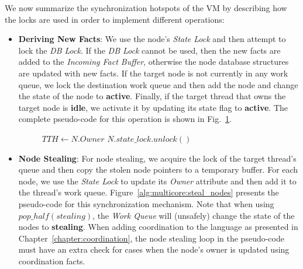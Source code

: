 
We now summarize the synchronization hotspots of the VM by describing how the locks
are used in order to implement different operations:

\begin{itemize}

   \item \textbf{Deriving New Facts}: We use the node's \emph{State Lock} and
      then attempt to lock the \emph{DB Lock}. If the \emph{DB Lock} cannot be
      used, then the new facts are added to the \emph{Incoming Fact Buffer},
      otherwise the node database structures are updated with new facts. If the
      target node is not currently in any work queue, we lock the destination
      work queue and then add the node and change the state of the node to
      \textbf{active}. Finally, if the target thread that owns the target node
      is \textbf{idle}, we activate it by updating its state flag to
      \textbf{active}. The complete pseudo-code for this operation is shown in
      Fig.~\ref{alg:multicore:new_fact}.

\begin{figure}
\begin{algorithm}[H]
   $TTH \longleftarrow N.Owner$\;
   $N.state\_lock.unlock()$\;
\end{algorithm}
 \label{alg:multicore:new_fact}
\end{figure}


   \item \textbf{Node Stealing}: For node stealing, we acquire the lock of the
      target thread's queue and then copy the stolen node pointers to a
      temporary buffer. For each node, we use the \emph{State Lock} to update
      its \emph{Owner} attribute and then add it to the thread's work queue.
      Figure~\ref{alg:multicore:steal_nodes} presents the pseudo-code for this
      synchronization mechanism. Note that when using $pop\_half(stealing)$, the
      \emph{Work Queue} will (unsafely) change the state of the nodes to
      \textbf{stealing}. When adding coordination to the language as presented
      in Chapter~\ref{chapter:coordination}, the node stealing loop in the
      pseudo-code must have an extra check for cases when the node's owner is
      updated using coordination facts.


\end{itemize}
